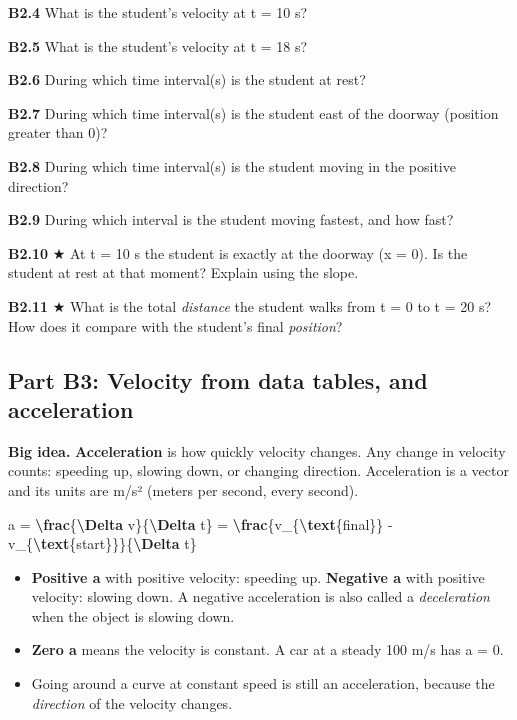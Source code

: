 \documentclass[
]{article}
\newenvironment{Shaded}{\begin{snugshade}}{\end{snugshade}}
\newcommand{\FunctionTok}[1]{\textcolor[rgb]{0.13,0.29,0.53}{\textbf{#1}}}
\newcommand{\NormalTok}[1]{#1}
\providecommand{\tightlist}{%
  \setlength{\itemsep}{0pt}\setlength{\parskip}{0pt}}
\begin{document}
\textbf{B2.4} What is the student's velocity at t = 10 s?

\textbf{B2.5} What is the student's velocity at t = 18 s?

\textbf{B2.6} During which time interval(s) is the student at rest?

\textbf{B2.7} During which time interval(s) is the student east of the
doorway (position greater than 0)?

\textbf{B2.8} During which time interval(s) is the student moving in the
positive direction?

\textbf{B2.9} During which interval is the student moving fastest, and
how fast?

\textbf{B2.10} ★ At t = 10 s the student is exactly at the doorway (x =
0). Is the student at rest at that moment? Explain using the slope.

\textbf{B2.11} ★ What is the total \emph{distance} the student walks
from t = 0 to t = 20 s? How does it compare with the student's final
\emph{position}?

\subsection{Part B3: Velocity from data tables, and
acceleration}\label{part-b3-velocity-from-data-tables-and-acceleration}

\textbf{Big idea.} \textbf{Acceleration} is how quickly velocity
changes. Any change in velocity counts: speeding up, slowing down, or
changing direction. Acceleration is a vector and its units are m/s²
(meters per second, every second).

\begin{Shaded}
\begin{Highlighting}[]
\NormalTok{a = }\FunctionTok{\textbackslash{}frac}\NormalTok{\{}\FunctionTok{\textbackslash{}Delta}\NormalTok{ v\}\{}\FunctionTok{\textbackslash{}Delta}\NormalTok{ t\} = }\FunctionTok{\textbackslash{}frac}\NormalTok{\{v\_\{}\FunctionTok{\textbackslash{}text}\NormalTok{\{final\}\} {-} v\_\{}\FunctionTok{\textbackslash{}text}\NormalTok{\{start\}\}\}\{}\FunctionTok{\textbackslash{}Delta}\NormalTok{ t\}}
\end{Highlighting}
\end{Shaded}

\begin{itemize}
\tightlist
\item
  \textbf{Positive a} with positive velocity: speeding up.
  \textbf{Negative a} with positive velocity: slowing down. A negative
  acceleration is also called a \emph{deceleration} when the object is
  slowing down.
\item
  \textbf{Zero a} means the velocity is constant. A car at a steady 100
  m/s has a = 0.
\item
  Going around a curve at constant speed is still an acceleration,
  because the \emph{direction} of the velocity changes.
\end{itemize}
\end{document}
